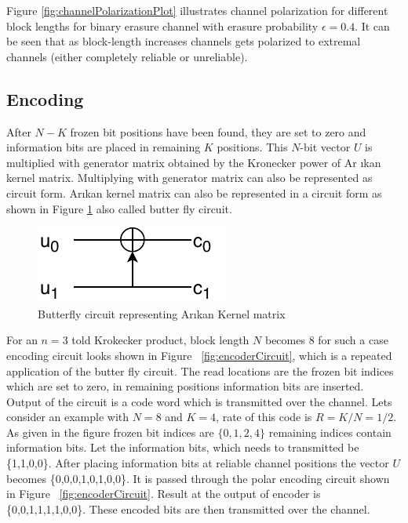 Figure \ref{fig:channelPolarizationPlot} illustrates channel polarization for different block lengths for binary erasure channel with erasure probability $\epsilon = 0.4$. It can be seen that as block-length increases channels gets polarized to extremal channels (either completely reliable or unreliable).

\subsection{Encoding} \label{polarEncoding}
After $N-K$ frozen bit positions have been found, they are set to zero and information bits are placed in remaining $K$ positions.
This $N$-bit vector $U$ is multiplied with generator matrix obtained by the Kronecker power of Ar \i kan kernel matrix. Multiplying with generator matrix can also be represented as circuit form. Ar\i kan kernel matrix can also be represented in a circuit form as shown in Figure \ref{fig:butterFlyCicuit} also called butter fly circuit.

\begin{figure}[h]
	\centering
	\includegraphics{./figures/ButterFlyCircuit.pdf}
	\caption{Butterfly circuit representing Ar\i kan Kernel matrix}
	\label{fig:butterFlyCicuit}
\end{figure}

For an $n = 3$ told Krokecker product, block length $N$ becomes 8 for such a case encoding circuit looks shown in  Figure ~\ref{fig:encoderCircuit}, which is a repeated application of the butter fly circuit. The read locations are the frozen bit indices which are set to zero, in remaining positions information bits are inserted. Output of the circuit is a code word which is transmitted over the channel. Lets consider an example with $N = 8$ and $K = 4$, rate of this code is $R = K/N = 1/2$. As given in the figure frozen bit indices are ${\{0,1,2,4\}}$ remaining indices contain information bits. Let the information bits, which needs to transmitted be \{1,1,0,0\}. After placing information bits at reliable channel positions the vector $U$ becomes \{0,0,0,1,0,1,0,0\}. It is passed through the polar encoding circuit shown in Figure ~\ref{fig:encoderCircuit}. Result at the output of encoder is \{0,0,1,1,1,1,0,0\}. These encoded bits are then transmitted over the channel.

